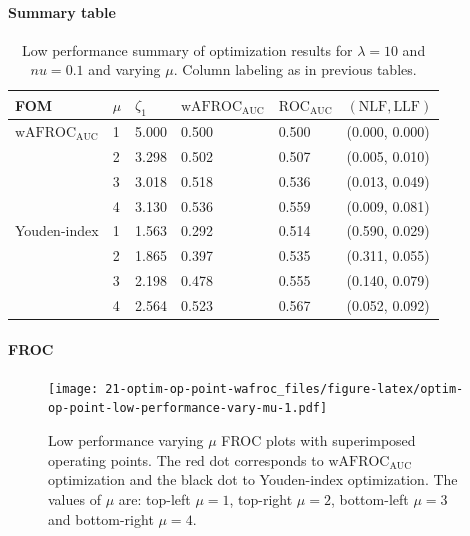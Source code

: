 \documentclass[
]{book}
\begin{document}
\hypertarget{summary-table-5}{%
\paragraph{Summary table}\label{summary-table-5}}

\begin{table}

\caption{\label{tab:optim-op-point-low-performance-vary-mu-table}Low performance summary of optimization results for $\lambda = 10$ and $nu = 0.1$ and varying $\mu$. Column labeling as in previous tables.}
\centering
\fontsize{10}{12}\selectfont
\begin{tabular}[t]{llllll}
\toprule
FOM & $\mu$ & $\zeta_1$ & $\text{wAFROC}_\text{AUC}$ & $\text{ROC}_\text{AUC}$ & $\left( \text{NLF}, \text{LLF}\right)$\\
\midrule
$\text{wAFROC}_\text{AUC}$ & 1 & 5.000 & 0.500 & 0.500 & (0.000, 0.000)\\
 & 2 & 3.298 & 0.502 & 0.507 & (0.005, 0.010)\\
 & 3 & 3.018 & 0.518 & 0.536 & (0.013, 0.049)\\
 & 4 & 3.130 & 0.536 & 0.559 & (0.009, 0.081)\\
Youden-index & 1 & 1.563 & 0.292 & 0.514 & (0.590, 0.029)\\
\addlinespace
 & 2 & 1.865 & 0.397 & 0.535 & (0.311, 0.055)\\
 & 3 & 2.198 & 0.478 & 0.555 & (0.140, 0.079)\\
 & 4 & 2.564 & 0.523 & 0.567 & (0.052, 0.092)\\
\bottomrule
\end{tabular}
\end{table}

\hypertarget{froc-6}{%
\paragraph{FROC}\label{froc-6}}

\begin{figure}
\centering
\texttt{[image: 21-optim-op-point-wafroc\_files/figure-latex/optim-op-point-low-performance-vary-mu-1.pdf]}
\caption{\label{fig:optim-op-point-low-performance-vary-mu}Low performance varying \(\mu\) FROC plots with superimposed operating points. The red dot corresponds to \(\text{wAFROC}_\text{AUC}\) optimization and the black dot to Youden-index optimization. The values of \(\mu\) are: top-left \(\mu = 1\), top-right \(\mu = 2\), bottom-left \(\mu = 3\) and bottom-right \(\mu = 4\).}
\end{figure}
\end{document}
